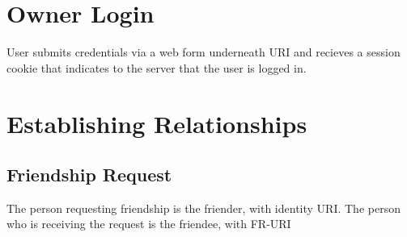 \documentclass[letterpaper,11pt,oneside]{article}
\begin{document}
\section{Owner Login}

User submits credentials via a web form underneath URI and recieves a session
cookie that indicates to the server that the user is logged in.

\section{Establishing Relationships}

\subsection{Friendship Request}

The person requesting friendship is the friender, with identity URI.
The person who is receiving the request is the friendee, with FR-URI
\end{document}
